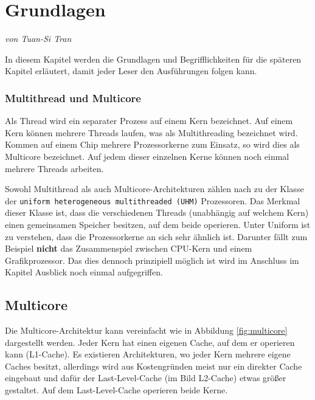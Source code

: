 \chapter{Grundlagen}
\label{sec:Grundlagen}
\textit{von Tuan-Si Tran}

In diesem Kapitel werden die Grundlagen und Begrifflichkeiten für die späteren Kapitel erläutert, damit jeder Leser den Ausführungen folgen kann.

\subsection*{Multithread und Multicore}
Als Thread wird ein separater Prozess auf einem Kern bezeichnet. Auf einem Kern können mehrere Threads laufen, was als Multithreading bezeichnet wird. Kommen auf einem Chip mehrere Prozessorkerne zum Einsatz, so wird dies als Multicore bezeichnet. Auf jedem dieser einzelnen Kerne können noch einmal mehrere Threads arbeiten.

Sowohl Multithread als auch Multicore-Architekturen zählen nach \cite{GARCIA} zu der Klasse der \texttt{uniform heterogeneous multithreaded (UHM)} Prozessoren. Das Merkmal dieser Klasse ist, dass die verschiedenen Threads (unabhängig auf welchem Kern) einen gemeinsamen Speicher besitzen, auf dem beide operieren. Unter Uniform ist zu verstehen, dass die Prozessorkerne an sich sehr ähnlich ist. Darunter fällt zum Beispiel \textbf{nicht} das Zusammenspiel zwischen CPU-Kern und einem Grafikprozessor. Das dies dennoch prinzipiell möglich ist wird im Anschluss im Kapitel Ausblick noch einmal aufgegriffen.

\section{Multicore}
\label{sec:Multicore}
Die Multicore-Architektur kann vereinfacht wie in Abbildung \ref{fig:multicore} dargestellt werden. Jeder Kern hat einen eigenen Cache, auf dem er operieren kann (L1-Cache). Es existieren Architekturen, wo jeder Kern mehrere eigene Caches besitzt, allerdings wird aus Kostengründen meist nur ein direkter Cache eingebaut und dafür der Last-Level-Cache (im Bild L2-Cache) etwas größer gestaltet. Auf dem  Last-Level-Cache operieren beide Kerne.

